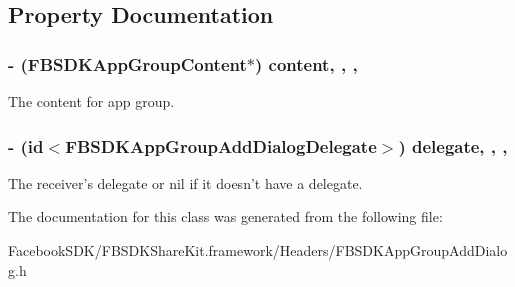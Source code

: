 \subsection{Property Documentation}
\hypertarget{interface_f_b_s_d_k_app_group_add_dialog_a2a7109b4320ff393d28fff95e6bff301}{
\subsubsection[{content}]{\setlength{\rightskip}{0pt plus 5cm}-\/ ({\bf F\-B\-S\-D\-K\-App\-Group\-Content}$\ast$) content\hspace{0.3cm}{\ttfamily [read]}, {\ttfamily [write]}, {\ttfamily [nonatomic]}, {\ttfamily [copy]}}}\label{interface_f_b_s_d_k_app_group_add_dialog_a2a7109b4320ff393d28fff95e6bff301}
The content for app group. \hypertarget{interface_f_b_s_d_k_app_group_add_dialog_a0a92aa54b858fdf0f62b6d98bc09ab80}{
\subsubsection[{delegate}]{\setlength{\rightskip}{0pt plus 5cm}-\/ (id$<${\bf F\-B\-S\-D\-K\-App\-Group\-Add\-Dialog\-Delegate}$>$) delegate\hspace{0.3cm}{\ttfamily [read]}, {\ttfamily [write]}, {\ttfamily [nonatomic]}, {\ttfamily [weak]}}}\label{interface_f_b_s_d_k_app_group_add_dialog_a0a92aa54b858fdf0f62b6d98bc09ab80}
The receiver's delegate or nil if it doesn't have a delegate. 

The documentation for this class was generated from the following file\-:\begin{DoxyCompactItemize}
\item 
Facebook\-S\-D\-K/\-F\-B\-S\-D\-K\-Share\-Kit.\-framework/\-Headers/F\-B\-S\-D\-K\-App\-Group\-Add\-Dialog.\-h\end{DoxyCompactItemize}
